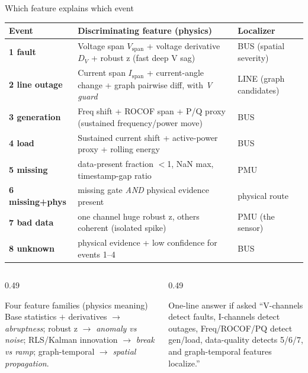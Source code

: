 ﻿\documentclass[10pt,aspectratio=169]{beamer}
\begin{document}
\begin{frame}{Which feature explains which event}
\scriptsize
\centering
\begin{tabular}{p{}p{}p{}}
\toprule
\textbf{Event} & \textbf{Discriminating feature (physics)} & \textbf{Localizer}\\
\midrule
\textbf{1 fault} & Voltage span $V_{\mathrm{span}}$ + voltage derivative $D_V$ + robust z (fast deep V sag) & BUS (spatial severity)\\
\textbf{2 line outage} & Current span $I_{\mathrm{span}}$ + current-angle change + graph pairwise diff, with \emph{V guard} & LINE (graph candidates)\\
\textbf{3 generation} & Freq shift + ROCOF span + P/Q proxy (sustained frequency/power move) & BUS\\
\textbf{4 load} & Sustained current shift + active-power proxy + rolling energy & BUS\\
\textbf{5 missing} & data-present fraction $<$1, NaN max, timestamp-gap ratio & PMU\\
\textbf{6 missing+phys} & missing gate \emph{AND} physical evidence present & physical route\\
\textbf{7 bad data} & one channel huge robust z, others coherent (isolated spike) & PMU (the sensor)\\
\textbf{8 unknown} & physical evidence + low confidence for events 1--4 & BUS\\
\bottomrule
\end{tabular}
\vspace{2mm}
\begin{columns}[T,totalwidth=\textwidth]
\begin{column}{0.49\textwidth}
\begin{block}{Four feature families (physics meaning)}
\scriptsize
Base statistics $+$ derivatives $\rightarrow$ \emph{abruptness}; robust z $\rightarrow$ \emph{anomaly vs noise}; RLS/Kalman innovation $\rightarrow$ \emph{break vs ramp}; graph-temporal $\rightarrow$ \emph{spatial propagation}.
\end{block}
\end{column}
\begin{column}{0.49\textwidth}
\begin{alertblock}{One-line answer if asked}
``V-channels detect faults, I-channels detect outages, Freq/ROCOF/PQ detect gen/load, data-quality detects 5/6/7, and graph-temporal features localize.''
\end{alertblock}
\end{column}
\end{columns}
\end{frame}
\end{document}
